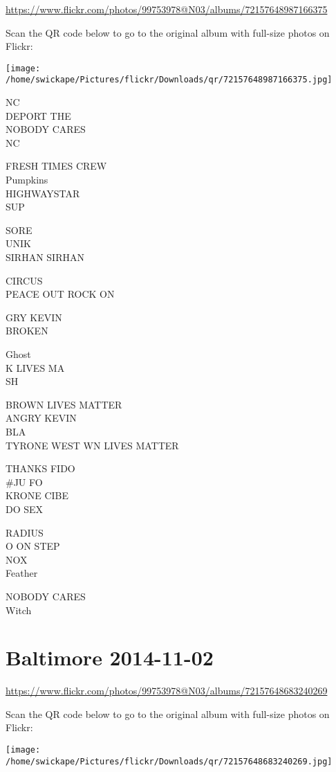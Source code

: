 \documentclass[10pt,letterpaper]{article}
\begin{document}
\url{https://www.flickr.com/photos/99753978@N03/albums/72157648987166375}

Scan the QR code below to go to the original album with full-size photos on Flickr:

\texttt{[image: /home/swickape/Pictures/flickr/Downloads/qr/72157648987166375.jpg]}


NC\\
DEPORT THE\\
NOBODY CARES\\
NC

FRESH TIMES CREW\\
Pumpkins\\
HIGHWAYSTAR\\
SUP

SORE\\
UNIK\\
SIRHAN SIRHAN

CIRCUS\\
PEACE OUT ROCK ON

GRY KEVIN\\
BROKEN

Ghost\\
K LIVES MA\\
SH

BROWN LIVES MATTER\\
ANGRY KEVIN\\
BLA\\
TYRONE WEST WN LIVES MATTER

THANKS FIDO\\
\#JU FO\\
KRONE CIBE\\
DO SEX

RADIUS\\
O ON STEP\\
NOX\\
Feather

NOBODY CARES\\
Witch


\section*{Baltimore 2014-11-02}

\url{https://www.flickr.com/photos/99753978@N03/albums/72157648683240269}

Scan the QR code below to go to the original album with full-size photos on Flickr:

\texttt{[image: /home/swickape/Pictures/flickr/Downloads/qr/72157648683240269.jpg]}
\end{document}
